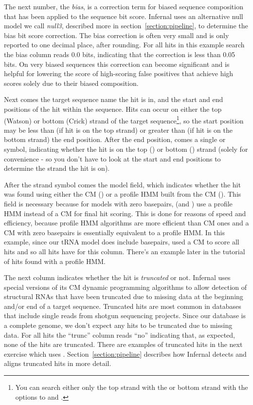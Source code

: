 The next number, the \emph{bias}, is a correction term for biased
sequence composition that has been applied to the sequence bit
score. Infernal uses an alternative null model we call \emph{null3},
described more in section~\ref{section:pipeline}, to determine the bias
bit score correction. The bias correction is often very small and is
only reported to one decimal place, after rounding. For all hits in
this example search the bias column reads 0.0 bits, indicating that
the correction is less than 0.05 bits. On very biased sequences this
correction can become significant and is helpful for lowering the
score of high-scoring false positives that achieve high scores solely
due to their biased composition. 

Next comes the target sequence name the hit is in, and the start and
end positions of the hit within the sequence. Hits can occur on either
the top (Watson) or bottom (Crick) strand of the target
sequence\footnote{You can search either only the top strand with the
 or bottom strand with the  options
to  and .}, so the start position may be
less than (if hit is on the top strand) or greater than (if hit is on
the bottom strand) the end position. After the end position, comes a single
\otext{+} or \otext{-} symbol, indicating whether the hit is on the
top (\otext{+}) or bottom (\otext{-}) strand (solely for convenience -
so you don't have to look at the start and end positions to determine
the strand the hit is on).

After the strand symbol comes the model field, which indicates whether
the hit was found using either the CM () or a profile HMM
built from the CM (). This field is necessary because for
models with zero basepairs,  (and ) use a
profile HMM instead of a CM for final hit scoring. This is done for
reasons of speed and efficiency, because profile HMM algorithms are
more efficient than CM ones and a CM with zero basepairs is
essentially equivalent to a profile HMM. In this example, since our
tRNA model does include basepairs,  used a CM to score
all hits and so all hits have  for this column. There's an
example later in the tutorial of hits found with a profile HMM.

The next column indicates whether the hit is \emph{truncated} or
not. Infernal uses special versions of its CM dynamic programming
algorithms to allow detection of structural RNAs that have been
truncated due to missing data at the beginning and/or end of a target
sequence. Truncated hits are most common in databases that include
single reads from shotgun sequencing projects. Since our database is a
complete genome, we don't expect any hits to be truncated due to
missing data. For all hits the ``trunc'' column reads
``no'' indicating that, as expected, none of the hits are
truncated. There are examples of truncated hits in the next exercise
which uses . Section~\ref{section:pipeline} describes how
Infernal detects and aligns truncated hits in more detail.

